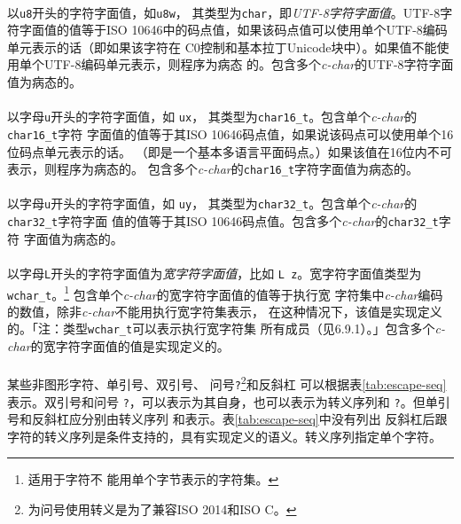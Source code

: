 \paragraph{}
以\texttt{u8}开头的字符字面值，如\texttt{u8\qsgl{}w\qsgl}，
其类型为\texttt{char}，即\textit{UTF-8字符字面值}。UTF-8字符字面值的值等于ISO
10646中的码点值，如果该码点值可以使用单个UTF-8编码单元表示的话（即如果该字符在
C0控制和基本拉丁Unicode块中）。如果值不能使用单个UTF-8编码单元表示，则程序为病态
的。包含多个\textit{c-char}的UTF-8字符字面值为病态的。

\paragraph{}
以字母\texttt{u}开头的字符字面值，如
\texttt{u\qsgl{}x\qsgl}，
其类型为\texttt{char16\_t}。包含单个\textit{c-char}的\texttt{char16\_t}字符
字面值的值等于其ISO 10646码点值，如果说该码点可以使用单个16位码点单元表示的话。
（即是一个基本多语言平面码点。）如果该值在16位内不可表示，则程序为病态的。
包含多个\textit{c-char}的\texttt{char16\_t}字符字面值为病态的。

\paragraph{}
以字母\texttt{u}开头的字符字面值，如
\texttt{u\qsgl{}y\qsgl}，
其类型为\texttt{char32\_t}。包含单个\textit{c-char}的\texttt{char32\_t}字符字面
值的值等于其ISO 10646码点值。包含多个\textit{c-char}的\texttt{char32\_t}字符
字面值为病态的。

\paragraph{}
以字母\texttt{L}开头的字符字面值为\textit{宽字符字面值}，比如
\texttt{L\qsgl
z\qsgl}。宽字符字面值类型为\texttt{wchar\_t}。\footnote{适用于字符不
能用单个字节表示的字符集。} 包含单个\textit{c-char}的宽字符字面值的值等于执行宽
字符集中\textit{c-char}编码的数值，除非\textit{c-char}不能用执行宽字符集表示，
在这种情况下，该值是实现定义的。「注：类型\texttt{wchar\_t}可以表示执行宽字符集
所有成员（见6.9.1）。」包含多个\textit{c-char}的宽字符字面值的值是实现定义的。

\paragraph{}
某些非图形字符、单引号\texttt{\qsgl}、双引号\texttt{\qdbl}、
问号\texttt{?}\footnote{为问号使用转义是为了兼容ISO 2014和ISO C。}和反斜杠
\texttt{\bslh}可以根据表\ref{tab:escape-seq}表示。双引号\texttt{\qdbl}和问号
\texttt{?}，可以表示为其自身，也可以表示为转义序列\texttt{\bslh\qdbl}和
\texttt{\bslh ?}。但单引号\texttt{\qsgl}和反斜杠\texttt{\bslh}应分别由转义序列
\texttt{\bslh\qsgl}和\texttt{\bslh\bslh}表示。表\ref{tab:escape-seq}中没有列出
反斜杠后跟字符的转义序列是条件支持的，具有实现定义的语义。转义序列指定单个字符。

